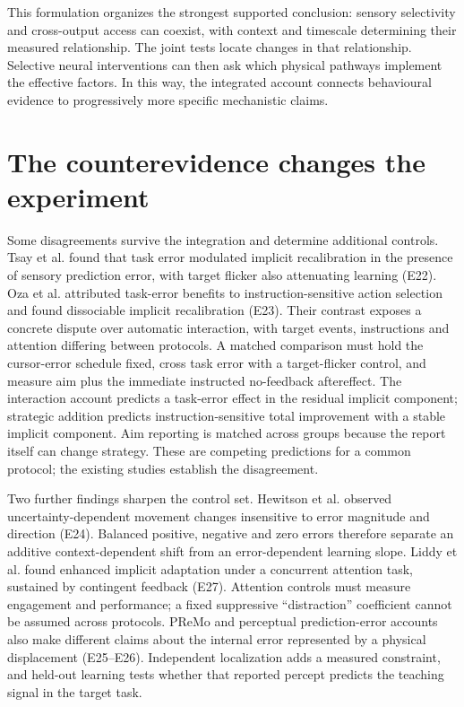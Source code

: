 \documentclass[11pt,a4paper]{article}
\begin{document}
This formulation organizes the strongest supported conclusion: sensory selectivity and cross-output access can coexist, with context and timescale determining their measured relationship. The joint tests locate changes in that relationship. Selective neural interventions can then ask which physical pathways implement the effective factors. In this way, the integrated account connects behavioural evidence to progressively more specific mechanistic claims.

\section{The counterevidence changes the experiment}
Some disagreements survive the integration and determine additional controls. Tsay et al. found that task error modulated implicit recalibration in the presence of sensory prediction error, with target flicker also attenuating learning (E22). Oza et al. attributed task-error benefits to instruction-sensitive action selection and found dissociable implicit recalibration (E23). Their contrast exposes a concrete dispute over automatic interaction, with target events, instructions and attention differing between protocols. A matched comparison must hold the cursor-error schedule fixed, cross task error with a target-flicker control, and measure aim plus the immediate instructed no-feedback aftereffect. The interaction account predicts a task-error effect in the residual implicit component; strategic addition predicts instruction-sensitive total improvement with a stable implicit component. Aim reporting is matched across groups because the report itself can change strategy. These are competing predictions for a common protocol; the existing studies establish the disagreement. \cite{tsay2022,oza2024}

Two further findings sharpen the control set. Hewitson et al. observed uncertainty-dependent movement changes insensitive to error magnitude and direction (E24). Balanced positive, negative and zero errors therefore separate an additive context-dependent shift from an error-dependent learning slope. Liddy et al. found enhanced implicit adaptation under a concurrent attention task, sustained by contingent feedback (E27). Attention controls must measure engagement and performance; a fixed suppressive ``distraction'' coefficient cannot be assumed across protocols. PReMo and perceptual prediction-error accounts also make different claims about the internal error represented by a physical displacement (E25--E26). Independent localization adds a measured constraint, and held-out learning tests whether that reported percept predicts the teaching signal in the target task. \cite{uncertain2023,attention2026,premo2022,percept2026}
\end{document}
